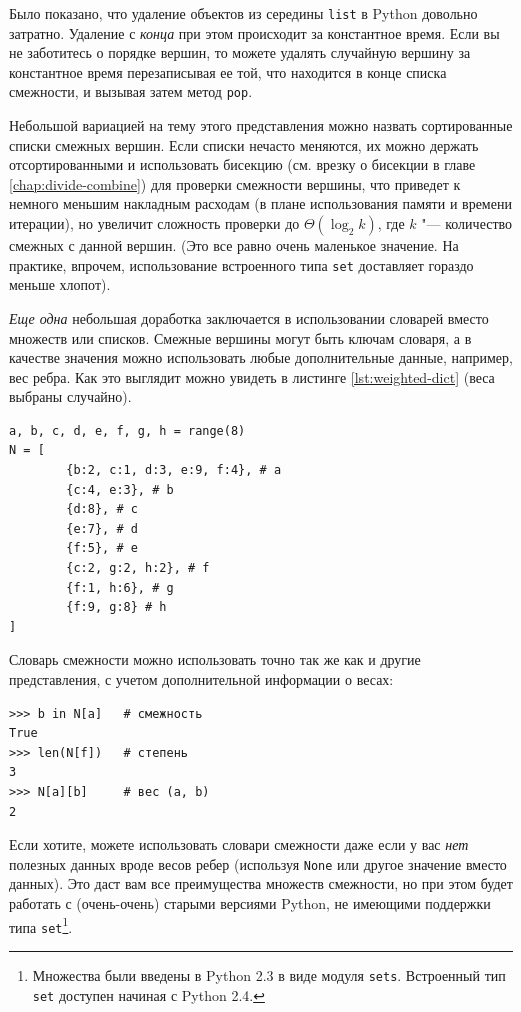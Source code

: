 \begin{note}[Совет:]
Было показано, что удаление объектов из середины \texttt{list} в Python довольно затратно. Удаление с \textit{конца} при этом происходит за константное время. Если вы не заботитесь о порядке вершин, то можете удалять случайную вершину за константное время перезаписывая ее той, что находится в конце списка смежности, и вызывая затем метод \texttt{pop}.
\end{note}

Небольшой вариацией на тему этого представления можно назвать сортированные списки смежных вершин. Если списки нечасто меняются, их можно держать отсортированными и использовать бисекцию (см. врезку о бисекции в главе \ref{chap:divide-combine}) для проверки смежности вершины, что приведет к немного меньшим накладным расходам (в плане использования памяти и времени итерации), но увеличит сложность проверки до $\Theta(\log_2 k)$, где $k$ "--- количество смежных с данной вершин. (Это все равно очень маленькое значение. На практике, впрочем, использование встроенного типа \texttt{set} доставляет гораздо меньше хлопот).

\textit{Еще одна} небольшая доработка заключается в использовании словарей вместо множеств или списков. Смежные вершины могут быть ключам словаря, а в качестве значения можно использовать любые дополнительные данные, например, вес ребра. Как это выглядит можно увидеть в листинге \ref{lst:weighted-dict} (веса выбраны случайно).

\begin{lstlisting}[caption={Словарь смежности с весами ребер}, label={lst:weighted-dict}]
a, b, c, d, e, f, g, h = range(8)
N = [
		{b:2, c:1, d:3, e:9, f:4}, # a
		{c:4, e:3}, # b
		{d:8}, # c
		{e:7}, # d
		{f:5}, # e
		{c:2, g:2, h:2}, # f
		{f:1, h:6}, # g
		{f:9, g:8} # h
]
\end{lstlisting}

Словарь смежности можно использовать точно так же как и другие представления, с учетом дополнительной информации о весах:
\begin{lstlisting}
>>> b in N[a]	# смежность
True
>>> len(N[f])	# степень
3
>>> N[a][b]		# вес (a, b)
2
\end{lstlisting}

Если хотите, можете использовать словари смежности даже если у вас \textit{нет} полезных данных вроде весов ребер (используя \texttt{None} или другое значение вместо данных). Это даст вам все преимущества множеств смежности, но при этом будет работать с (очень-очень) старыми версиями Python, не имеющими поддержки типа \texttt{set}\footnote{Множества были введены в Python 2.3 в виде модуля \texttt{sets}. Встроенный тип \texttt{set} доступен начиная с Python 2.4.}.

